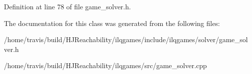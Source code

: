 Definition at line 78 of file game\+\_\+solver.\+h.



The documentation for this class was generated from the following files\+:\begin{DoxyCompactItemize}
\item 
/home/travis/build/\+H\+J\+Reachability/ilqgames/include/ilqgames/solver/game\+\_\+solver.\+h\item 
/home/travis/build/\+H\+J\+Reachability/ilqgames/src/game\+\_\+solver.\+cpp\end{DoxyCompactItemize}
